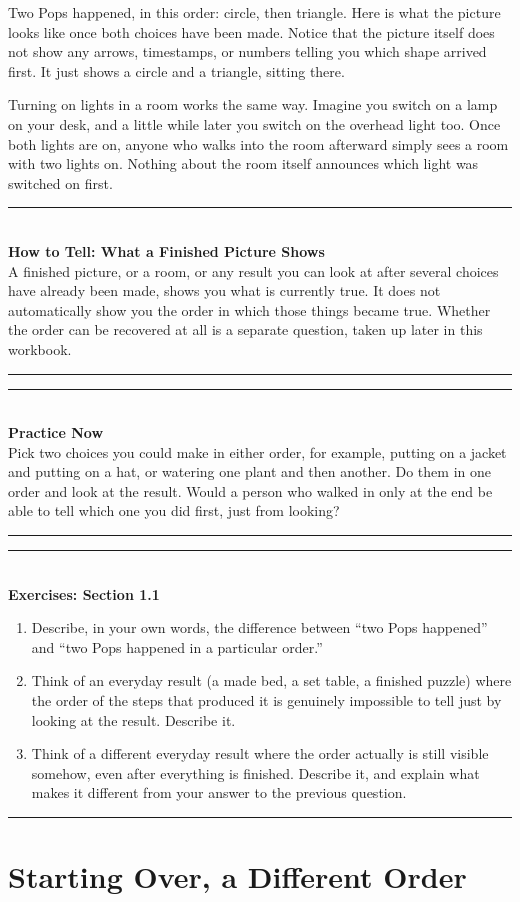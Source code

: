 \documentclass[11pt]{book}
\newenvironment{algorithmproc}[1]{%
\vspace{0.6em}\noindent\rule{\linewidth}{0.6pt}\\[0.2em]\textbf{How to Tell: #1}\\[0.3em]}%
{\\[0.2em]\noindent\rule{\linewidth}{0.6pt}\vspace{0.6em}}
\newenvironment{practicenow}{%
\vspace{0.6em}\noindent\rule{\linewidth}{0.6pt}\\[0.2em]\textbf{Practice Now}\\[0.3em]}%
{\\[0.2em]\noindent\rule{\linewidth}{0.6pt}\vspace{0.6em}}
\newenvironment{exercisebox}[1]{%
\vspace{0.8em}\noindent\rule{\linewidth}{0.6pt}\\[0.2em]\textbf{Exercises: #1}\\[0.3em]%
\begin{enumerate}[label=\arabic*., itemsep=0.4em]}%
{\end{enumerate}\noindent\rule{\linewidth}{0.6pt}\vspace{0.6em}}
\begin{document}
Two Pops happened, in this order: circle, then triangle. Here is what the picture looks like once both choices have been made. Notice that the picture itself does not show any arrows, timestamps, or numbers telling you which shape arrived first. It just shows a circle and a triangle, sitting there.

Turning on lights in a room works the same way. Imagine you switch on a lamp on your desk, and a little while later you switch on the overhead light too. Once both lights are on, anyone who walks into the room afterward simply sees a room with two lights on. Nothing about the room itself announces which light was switched on first.

\begin{algorithmproc}{What a Finished Picture Shows}
A finished picture, or a room, or any result you can look at after several choices have already been made, shows you what is currently true. It does not automatically show you the order in which those things became true. Whether the order can be recovered at all is a separate question, taken up later in this workbook.
\end{algorithmproc}

\begin{practicenow}
Pick two choices you could make in either order, for example, putting on a jacket and putting on a hat, or watering one plant and then another. Do them in one order and look at the result. Would a person who walked in only at the end be able to tell which one you did first, just from looking?
\end{practicenow}

\begin{exercisebox}{Section 1.1}
\item Describe, in your own words, the difference between ``two Pops happened'' and ``two Pops happened in a particular order.''
\item Think of an everyday result (a made bed, a set table, a finished puzzle) where the order of the steps that produced it is genuinely impossible to tell just by looking at the result. Describe it.
\item Think of a different everyday result where the order actually is still visible somehow, even after everything is finished. Describe it, and explain what makes it different from your answer to the previous question.
\end{exercisebox}

\chapter{Starting Over, a Different Order}
\end{document}

